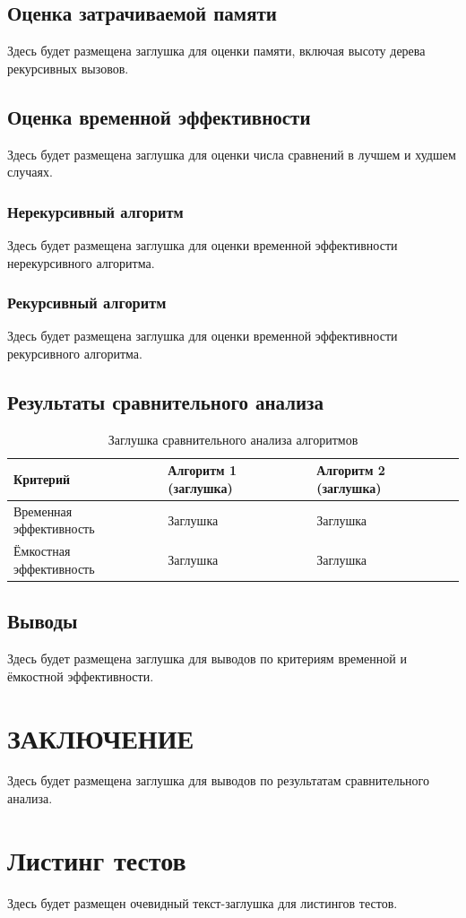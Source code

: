 \documentclass{bmstu}
\begin{document}
\section{Оценка затрачиваемой памяти}
Здесь будет размещена заглушка для оценки памяти, включая высоту дерева рекурсивных вызовов.

\section{Оценка временной эффективности}
Здесь будет размещена заглушка для оценки числа сравнений в лучшем и худшем случаях.

\subsection{Нерекурсивный алгоритм}
Здесь будет размещена заглушка для оценки временной эффективности нерекурсивного алгоритма.

\subsection{Рекурсивный алгоритм}
Здесь будет размещена заглушка для оценки временной эффективности рекурсивного алгоритма.

\section{Результаты сравнительного анализа}
\begin{table}[H]
	\centering
	\caption{Заглушка сравнительного анализа алгоритмов}
	\label{tab:comparison-placeholder}
	\begin{tabularx}{\textwidth}{|X|X|X|}
		\hline
		Критерий                & Алгоритм 1 (заглушка) & Алгоритм 2 (заглушка) \\ \hline
		Временная эффективность & Заглушка              & Заглушка              \\ \hline
		Ёмкостная эффективность & Заглушка              & Заглушка              \\ \hline
	\end{tabularx}
\end{table}

\section{Выводы}
Здесь будет размещена заглушка для выводов по критериям временной и ёмкостной эффективности.

\chapter*{ЗАКЛЮЧЕНИЕ}

Здесь будет размещена заглушка для выводов по результатам сравнительного анализа.

\makebibliography

\appendix
\chapter{Листинг тестов}
Здесь будет размещен очевидный текст-заглушка для листингов тестов.
\end{document}
